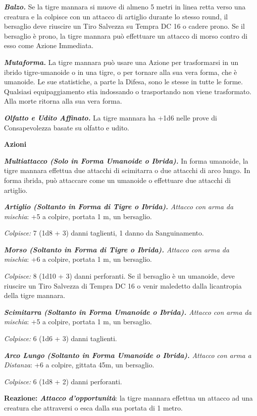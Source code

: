 \begin{multicols}{2}
{\emph{\textbf{Balzo.}} Se la tigre mannara si muove di almeno 5 metri in linea retta verso una creatura e la colpisce con un attacco di artiglio durante lo stesso round, il bersaglio deve riuscire un Tiro Salvezza su Tempra DC 16 o cadere prono. Se il bersaglio è prono, la tigre mannara può effettuare un attacco di morso contro di esso come Azione Immediata.

\emph{\textbf{Mutaforma.}} La tigre mannara può usare una Azione per trasformarsi in un ibrido tigre-umanoide o in una tigre, o per tornare alla sua vera forma, che è umanoide. Le sue statistiche, a parte la Difesa, sono le stesse in tutte le forme. Qualsiasi equipaggiamento stia indossando o trasportando non viene trasformato. Alla morte ritorna alla sua vera forma.

\emph{\textbf{Olfatto e Udito Affinato.}} La tigre mannara ha +1d6 nelle prove di Consapevolezza basate su olfatto e udito.

\textbf{Azioni}

\emph{\textbf{Multiattacco (Solo in Forma Umanoide o Ibrida).}} In forma umanoide, la tigre mannara effettua due attacchi di scimitarra o due attacchi di arco lungo. In forma ibrida, può attaccare come un umanoide o effettuare due attacchi di artiglio.

\emph{\textbf{Artiglio (Soltanto in Forma di Tigre o Ibrida).} Attacco con arma da mischia}: +5 a colpire, portata 1 m, un bersaglio.

\emph{Colpisce:} 7 (1d8 + 3) danni taglienti, 1 danno da Sanguinamento.

\emph{\textbf{Morso (Soltanto in Forma di Tigre o Ibrida).} Attacco con arma da mischia}: +6 a colpire, portata 1 m, un bersaglio.

\emph{Colpisce:} 8 (1d10 + 3) danni perforanti. Se il bersaglio è un umanoide, deve riuscire un Tiro Salvezza di Tempra DC 16 o venir maledetto dalla licantropia della tigre mannara.

\emph{\textbf{Scimitarra (Soltanto in Forma Umanoide o Ibrida).} Attacco con arma da mischia}: +5 a colpire, portata 1 m, un bersaglio.

\emph{Colpisce:} 6 (1d6 + 3) danni taglienti.

\emph{\textbf{Arco Lungo (Soltanto in Forma Umanoide o Ibrida).} Attacco con arma a Distanza}: +6 a colpire, gittata 45m, un bersaglio.

\emph{Colpisce:} 6 (1d8 + 2) danni perforanti.

\textbf{Reazione: \emph{Attacco d'opportunità}}: la tigre mannara effettua un attacco ad una creatura che attraversi o esca dalla sua portata di 1 metro.

}
\end{multicols}

